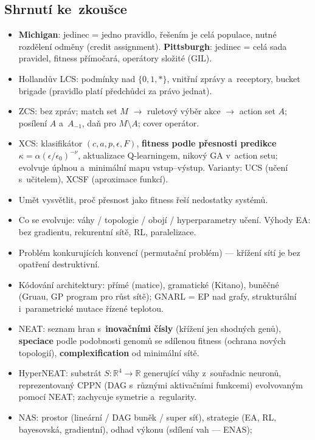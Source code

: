 \documentclass[11pt,a4paper]{article}
\theoremstyle{definition}
\begin{document}
\subsection{Shrnutí ke~zkoušce}

\begin{itemize}
\item \textbf{Michigan}: jedinec = jedno pravidlo, řešením je celá populace,
  nutné rozdělení odměny (credit assignment).
  \textbf{Pittsburgh}: jedinec = celá sada pravidel, fitness přímočará,
  operátory složité (GIL).
\item Hollandův LCS: podmínky nad $\{0,1,*\}$, vnitřní zprávy a~receptory,
  bucket brigade (pravidlo platí předchůdci za právo jednat).
\item ZCS: bez zpráv; match set $M$ $\to$ ruletový výběr akce $\to$ action set
  $A$; posílení $A$ a~$A_{-1}$, daň pro $M \setminus A$; cover operátor.
\item XCS: klasifikátor $(c,a,p,\epsilon,F)$, \textbf{fitness podle přesnosti
  predikce} $\kappa = \alpha(\epsilon/\epsilon_0)^{-\nu}$, aktualizace
  Q-learningem, nikový GA v~action setu; evolvuje úplnou a~minimální mapu
  vstup--výstup. Varianty: UCS (učení s~učitelem), XCSF (aproximace funkcí).
\item Umět vysvětlit, proč přesnost jako fitness řeší nedostatky
   systémů.
\item Co se evolvuje: váhy / topologie / obojí / hyperparametry učení.
  Výhody EA: bez gradientu, rekurentní sítě, RL, paralelizace.
\item Problém konkurujících konvencí (permutační problém) --- křížení sítí
  je bez opatření destruktivní.
\item Kódování architektury: přímé (matice), gramatické (Kitano), buněčné
  (Gruau, GP program pro růst sítě); GNARL = EP nad grafy, strukturální
  i~parametrické mutace řízené teplotou.
\item NEAT: seznam hran s~\textbf{inovačními čísly} (křížení jen shodných
  genů), \textbf{speciace} podle podobnosti genomů se sdílenou fitness
  (ochrana nových topologií), \textbf{complexification} od minimální sítě.
\item HyperNEAT: substrát $S:\mathbb{R}^4 \to \mathbb{R}$ generující váhy
  z~souřadnic neuronů, reprezentovaný CPPN (DAG s~různými aktivačními
  funkcemi) evolvovaným pomocí NEAT; zachycuje symetrie a~regularity.
\item NAS: prostor (lineární / DAG buněk / super síť), strategie (EA, RL,
  bayesovská, gradientní), odhad výkonu (sdílení vah --- ENAS);

\end{itemize}
\end{document}
